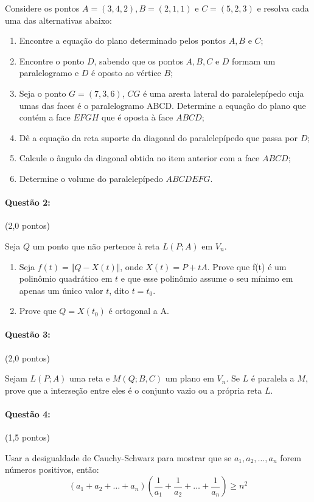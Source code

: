 \documentclass[12pt,a4paper]{article}
\begin{document}
Considere os pontos $A=(3,4,2), B=(2,1,1)$ e $C=(5,2,3)$ e resolva cada uma das alternativas abaixo:
\begin{enumerate}[label=(\alph*)]
\item Encontre a equação do plano determinado pelos pontos $A, B$ e $C$;
\item Encontre o ponto $D$, sabendo que os pontos $A, B, C$ e $D$ formam um paralelogramo e $D$ é oposto ao vértice $B$;
\item Seja o ponto $G=(7,3,6)$, $CG$ é uma aresta lateral do paralelepípedo cuja umas das
faces é o paralelogramo ABCD. Determine a equação do plano que contém a face $EFGH$ que é oposta à face $ABCD$;
\item Dê a equação da reta suporte da diagonal do paralelepípedo que passa por $D$;
\item Calcule o ângulo da diagonal obtida no item anterior com a face $ABCD$;
\item Determine o volume do paralelepípedo $ABCDEFG$.
\end{enumerate}

\paragraph{Questão 2:} (2,0 pontos)

Seja $Q$ um ponto que não pertence à reta $L(P;A)$ em $V_n$. 
\begin{enumerate}[label=(\alph*)]
\item Seja $f(t)=\Vert Q-X(t) \Vert$, onde $X(t)=P+tA$. Prove que f(t) é um polinômio quadrático em $t$ e que esse polinômio assume o seu mínimo em apenas um único valor $t$, dito $t=t_0$.
\item Prove que $Q=X(t_0)$ é ortogonal a A.
\end{enumerate}

\paragraph{Questão 3:} (2,0 pontos) 

Sejam $L(P;A)$ uma reta e $M(Q;B,C)$ um plano em $V_n$. Se $L$ é paralela a $M$, prove que
a interseção entre eles é o conjunto vazio ou a própria reta $L$.

\paragraph{Questão 4:} (1,5 pontos)

Usar a desigualdade de Cauchy-Schwarz para mostrar que se $a_1,a_2,\dots,a_n$ forem números positivos, então:
$$(a_1+a_2+\dots+a_n)(\dfrac{1}{a_1}+\dfrac{1}{a_2}+\dots+\dfrac{1}{a_n})\geq n^2 $$
\end{document}
